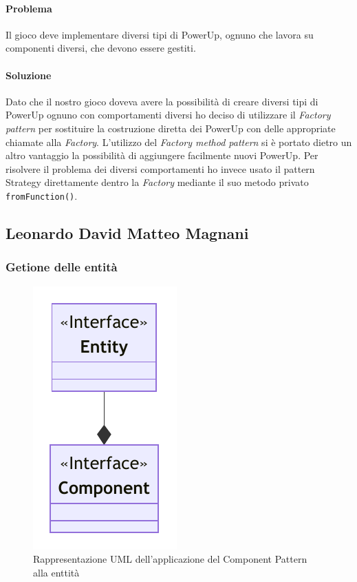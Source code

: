\documentclass[a4paper,12pt]{report}
\begin{document}
\paragraph{Problema} Il gioco deve implementare diversi tipi di PowerUp, ognuno che lavora su componenti diversi, che devono essere gestiti.

\paragraph{Soluzione} Dato che il nostro gioco doveva avere la possibilità di creare diversi tipi di PowerUp ognuno con comportamenti diversi ho deciso di utilizzare il \textit{Factory pattern} per sostituire la costruzione diretta dei PowerUp con delle appropriate chiamate alla \textit{Factory}. L'utilizzo del \textit{Factory method pattern} si è portato dietro un altro vantaggio la possibilità di aggiungere facilmente nuovi PowerUp.
Per risolvere il problema dei diversi comportamenti ho invece usato il pattern Strategy direttamente dentro la \textit{Factory} mediante il suo metodo privato \texttt{fromFunction()}.

\subsection*{Leonardo David Matteo Magnani}

\subsubsection{Getione delle entità}

\begin{figure}[H]
\centering{}
\includegraphics[width=.3\textwidth]{img/EntityComponentUML}
\caption{Rappresentazione UML dell'applicazione del Component Pattern alla enttità}
\end{figure}
\end{document}
